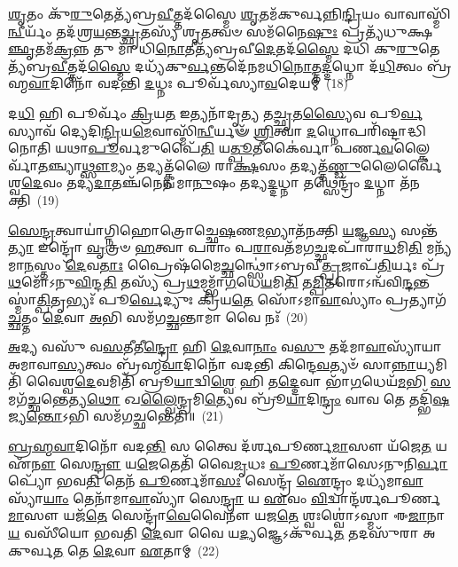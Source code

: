 \-\ul{𑌶𑍃}\-𑌤𑌂 𑌕𑍁᳴\-\ul{𑌰𑍁}\-𑌤𑍇𑌤𑍍𑌯᳴𑌬𑍍𑌰\-\ul{𑌵𑍀}\-𑌤𑍍𑌤𑌦᳴𑌸𑍍𑌮𑍈 \ul{𑌶𑍃}\-𑌤𑌮᳴𑌕𑍁𑌰𑍍𑌵𑌨𑍍𑌨𑌿\-\ul{𑌨𑍍𑌦𑍍𑌰𑌿}\-𑌯𑌂 𑌵𑌾𑌵𑌾𑌸𑍍𑌮𑌿᳴\-\ul{𑌨𑍍𑌵𑍀}\-𑌰𑍍𑌯𑌂᳴ 𑌤𑌦᳴𑌶𑍍𑌰\-\ul{𑌯}\-𑌨𑍍𑌤\-\ul{𑌚𑍍𑌛𑍃}\-𑌤𑌸𑍍𑌯᳴ 𑌶𑍃\-\ul{𑌤}\-𑌤𑍍𑌵𑍞 𑌸𑌮᳴𑌨𑍈\-\ul{𑌷𑍁𑌃} 𑌪𑍍𑌰𑌤𑍍𑌯᳴𑌧𑍁𑌕𑍍𑌷\-\ul{𑌞𑍍𑌛𑍃}\-𑌤𑌮᳴\-\ul{𑌕𑍍𑌰}\-𑌨𑍍𑌨 𑌤𑍁 𑌮𑌾᳴ 𑌧𑌿\-\ul{𑌨𑍋}\-𑌤𑍀𑌤𑍍𑌯᳴𑌬𑍍𑌰𑌵𑍀\-\ul{𑌦𑍇}\-𑌤𑌦᳴\-\ul{𑌸𑍍𑌮𑍈} 𑌦𑌧𑌿᳴ 𑌕𑍁\-\ul{𑌰𑍁}\-𑌤𑍇𑌤𑍍𑌯᳴𑌬𑍍𑌰\-\ul{𑌵𑍀}\-𑌤𑍍𑌤𑌦᳴\-\ul{𑌸𑍍𑌮𑍈} 𑌦𑌧𑍍𑌯᳴𑌕𑍁\-\ul{𑌰𑍍𑌵}\-𑌨𑍍𑌤𑌦𑍇᳴𑌨𑌮𑌧𑌿\-\ul{𑌨𑍋}\-𑌤𑍍𑌤\-\ul{𑌦𑍍𑌦}\-𑌧𑍍𑌨𑍋 𑌦᳴\-\ul{𑌧𑌿}\-𑌤𑍍𑌵𑌂 𑌬𑍍𑌰᳴𑌹𑍍𑌮\-\ul{𑌵𑌾}\-𑌦𑌿𑌨𑍋᳴ 𑌵𑌦𑌨𑍍𑌤𑌿 \ul{𑌦}\-𑌧𑍍𑌨𑌃 𑌪𑍂𑌰𑍍𑌵᳴𑌸𑍍𑌯𑌾\-\ul{𑌵}\-𑌦𑍇𑌯𑌮𑍍॑~(18)

𑌦\-\ul{𑌧𑌿} 𑌹𑌿 𑌪𑍂𑌰𑍍𑌵𑌂᳴ \ul{𑌕𑍍𑌰𑌿}\-𑌯\-\ul{𑌤} 𑌇𑌤𑍍𑌯𑌨𑌾᳴𑌦𑍃\-\ul{𑌤𑍍𑌯} 𑌤\-\ul{𑌚𑍍𑌛𑍃}\-𑌤\-\ul{𑌸𑍍𑌯𑍈}\-𑌵 𑌪𑍂\-\ul{𑌰𑍍𑌵}\-𑌸𑍍𑌯𑌾𑌵᳴ 𑌦𑍍𑌯𑍇𑌦𑌿\-\ul{𑌨𑍍𑌦𑍍𑌰𑌿}\-𑌯\-\ul{𑌮𑍇}\-𑌵𑌾𑌸𑍍𑌮𑌿᳴\-\ul{𑌨𑍍𑌵𑍀}\-𑌰𑍍𑌯𑍟᳴ \ul{𑌶𑍍𑌰𑌿}\-𑌤𑍍𑌵𑌾 \ul{𑌦}\-𑌧𑍍𑌨𑍋𑌪𑌰𑌿᳴𑌷𑍍𑌟𑌾𑌦𑍍𑌧𑌿𑌨𑍋𑌤𑌿 𑌯𑌥𑌾\-\ul{𑌪𑍂}\-𑌰𑍍𑌵𑌮𑍁𑌪𑍈᳴\-\ul{𑌤𑌿} 𑌯\-\ul{𑌤𑍍𑌪𑍂}\-𑌤𑍀𑌕𑍈॑𑌰𑍍𑌵𑌾 𑌪𑌰𑍍𑌣\-\ul{𑌵}\-𑌲𑍍𑌕𑍈𑌰𑍍𑌵𑌾᳴\-\ul{𑌤}\-𑌞𑍍𑌚𑍍𑌯𑌾\-\ul{𑌥𑍍𑌸𑍗}\-𑌮𑍍𑌯𑌂 𑌤𑌦𑍍𑌯𑌤𑍍𑌕𑍍𑌵᳴𑌲𑍈 𑌰𑌾\-\ul{𑌕𑍍𑌷}\-𑌸𑌂 𑌤𑌦𑍍𑌯𑌤𑍍𑌤᳴\-\ul{𑌣𑍍𑌡𑍁}\-𑌲𑍈𑌰𑍍𑌵𑍈॑𑌶𑍍𑌵\-\ul{𑌦𑍇}\-𑌵𑌂 𑌤𑌦𑍍𑌯\-\ul{𑌦𑌾}\-𑌤𑌞𑍍𑌚᳴𑌨𑍇𑌨 𑌮𑌾\-\ul{𑌨𑍁}\-𑌷𑌂 𑌤𑌦𑍍𑌯\-\ul{𑌦𑍍𑌦}\-𑌧𑍍𑌨𑌾 𑌤𑌥𑍍𑌸𑍇𑌨𑍍𑌦𑍍𑌰𑌂᳴ \ul{𑌦}\-𑌧𑍍𑌨𑌾 𑌤᳴𑌨𑌕𑍍𑌤𑌿~(19)

\-\ul{𑌸𑍇}\-\-\ul{𑌨𑍍𑌦𑍍𑌰}\-𑌤𑍍𑌵𑌾𑌯𑌾॑𑌗𑍍𑌨𑌿𑌹𑍋𑌤𑍍𑌰𑍋𑌚𑍍𑌛𑍇\-\ul{𑌷}\-𑌣\-\ul{𑌮}\-𑌭𑍍𑌯𑌾𑌤᳴𑌨𑌕𑍍𑌤𑌿 \ul{𑌯}\-𑌜𑍍𑌞\-\ul{𑌸𑍍𑌯} 𑌸𑌨𑍍𑌤᳴\-\ul{𑌤𑍍𑌯𑌾} 𑌇𑌨𑍍𑌦𑍍𑌰𑍋᳴ \ul{𑌵𑍃}\-𑌤𑍍𑌰𑍞 \ul{𑌹}\-𑌤𑍍𑌵𑌾 𑌪𑌰𑌾𑌂॑ 𑌪\-\ul{𑌰𑌾}\-𑌵𑌤᳴𑌮𑌗\-\ul{𑌚𑍍𑌛}\-𑌦𑌪𑌾᳴𑌰𑌾\-\ul{𑌧}\-𑌮𑌿\-\ul{𑌤𑌿} 𑌮𑌨𑍍𑌯᳴𑌮𑌾\-\ul{𑌨}\-𑌸𑍍𑌤𑌂 \ul{𑌦𑍇}\-𑌵\-\ul{𑌤𑌾𑌃} 𑌪𑍍𑌰𑍈𑌷᳴𑌮𑍈\-\ul{𑌚𑍍𑌛}\-𑌨𑍍𑌥𑍍𑌸𑍋॑\-𑌽𑌬𑍍𑌰𑌵𑍀\-\ul{𑌤𑍍𑌪𑍍𑌰}\-𑌜𑌾𑌪᳴\-\ul{𑌤𑌿}\-𑌰𑍍𑌯𑌃 𑌪𑍍𑌰᳴\-\ul{𑌥}\-𑌮𑍋᳴\-𑌽𑌨𑍁\-\ul{𑌵𑌿}\-𑌨𑍍𑌦\-\ul{𑌤𑌿} 𑌤𑌸𑍍𑌯᳴ 𑌪𑍍𑌰\-\ul{𑌥}\-𑌮𑌮𑍍𑌭𑌾᳴\-\ul{𑌗}\-𑌧𑍇\-\ul{𑌯}\-𑌮𑌿\-\ul{𑌤𑌿} 𑌤\-\ul{𑌮𑍍𑌪𑌿}\-𑌤𑌰𑍋\-𑌽𑌨𑍍𑌵᳴𑌵𑌿\-\ul{𑌨𑍍𑌦}\-𑌨𑍍𑌤𑌸𑍍𑌮𑌾॑\-\ul{𑌤𑍍𑌪𑌿}\-𑌤𑍃𑌭𑍍𑌯𑌃᳴ 𑌪𑍂\-\ul{𑌰𑍍𑌵𑍇}\-𑌦𑍍𑌯𑍁𑌃 𑌕𑍍𑌰𑌿᳴𑌯\-\ul{𑌤𑍇} 𑌸𑍋᳴\-𑌽𑌮𑌾\-\ul{𑌵𑌾}\-𑌸𑍍𑌯𑌾𑌂॑ 𑌪𑍍𑌰𑌤𑍍𑌯𑌾𑌗᳴\-\ul{𑌚𑍍𑌛}\-𑌤𑍍𑌤𑌂 \ul{𑌦𑍇}\-𑌵𑌾 \ul{𑌅}\-𑌭𑌿 𑌸𑌮᳴𑌗\-\ul{𑌚𑍍𑌛}\-𑌨𑍍𑌤𑌾𑌮𑌾 𑌵𑍈 𑌨𑌃᳴~(20)

\-\ul{𑌅}\-𑌦𑍍𑌯 𑌵𑌸𑍁᳴ 𑌵\-\ul{𑌸}\-𑌤𑍀𑌤𑍀\-\ul{𑌨𑍍𑌦𑍍𑌰𑍋} 𑌹𑌿 \ul{𑌦𑍇}\-𑌵𑌾\-\ul{𑌨𑌾𑌂} 𑌵\-\ul{𑌸𑍁} 𑌤𑌦᳴𑌮𑌾\-\ul{𑌵𑌾}\-𑌸𑍍𑌯𑌾᳴𑌯𑌾 𑌅𑌮𑌾𑌵𑌾\-\ul{𑌸𑍍𑌯}\-𑌤𑍍𑌵𑌂 𑌬𑍍𑌰᳴𑌹𑍍𑌮\-\ul{𑌵𑌾}\-𑌦𑌿𑌨𑍋᳴ 𑌵𑌦𑌨𑍍𑌤𑌿 𑌕𑌿𑌨𑍍𑌦𑍇\-\ul{𑌵}\-𑌤𑍍𑌯𑍞᳴ 𑌸𑌾\-\ul{𑌨𑍍𑌨𑌾}\-𑌯𑍍𑌯𑌮𑌿𑌤𑌿᳴ 𑌵𑍈𑌶𑍍𑌵\-\ul{𑌦𑍇}\-𑌵𑌮𑌿𑌤𑌿᳴ 𑌬𑍍𑌰𑍂\-\ul{𑌯𑌾}\-𑌦𑍍𑌵𑌿\-\ul{𑌶𑍍𑌵𑍇} 𑌹𑌿 𑌤\-\ul{𑌦𑍍𑌦𑍇}\-𑌵𑌾 𑌭𑌾᳴\-\ul{𑌗}\-𑌧𑍇𑌯᳴\-\ul{𑌮}\-𑌭𑌿 \ul{𑌸}\-𑌮𑌗᳴\-\ul{𑌚𑍍𑌛}\-𑌨𑍍𑌤𑍇𑌤𑍍𑌯\-\ul{𑌥𑍋} 𑌖\-\ul{𑌲𑍍𑌵𑍈}\-𑌨𑍍𑌦𑍍𑌰𑌮𑌿\-\ul{𑌤𑍍𑌯𑍇}\-𑌵 𑌬𑍍𑌰𑍂᳴\-\ul{𑌯𑌾}\-𑌦𑌿\-\ul{𑌨𑍍𑌦𑍍𑌰𑌂} 𑌵𑌾𑌵 𑌤𑍇 𑌤𑌦𑍍𑌭𑌿᳴\-\ul{𑌷}\-𑌜𑍍𑌯\-\ul{𑌨𑍍𑌤𑍋}\-\-𑌽𑌭𑌿 𑌸𑌮᳴𑌗\-\ul{𑌚𑍍𑌛}\-𑌨𑍍𑌤𑍇𑌤𑌿᳴॥~(21)

{}%

\-\ul{𑌬𑍍𑌰}\-\-\ul{𑌹𑍍𑌮}\-\-\ul{𑌵𑌾}\-𑌦𑌿𑌨𑍋᳴ 𑌵𑌦\-\ul{𑌨𑍍𑌤𑌿} 𑌸 𑌤𑍍𑌵𑍈 𑌦᳴𑌰𑍍𑌶𑌪𑍂𑌰𑍍𑌣\-\ul{𑌮𑌾}\-𑌸𑍗 𑌯᳴𑌜𑍇\-\ul{𑌤} 𑌯 𑌏᳴\-\ul{𑌨𑍗} 𑌸𑍇\-\ul{𑌨𑍍𑌦𑍍𑌰𑍗} 𑌯\-\ul{𑌜𑍇}\-𑌤𑍇𑌤𑌿᳴ 𑌵𑍈\-\ul{𑌮𑍃}\-𑌧𑌃 \ul{𑌪𑍂}\-𑌰𑍍𑌣𑌮𑌾᳴𑌸𑍇\-𑌽𑌨𑍁𑌨𑌿\-\ul{𑌰𑍍𑌵𑌾}\-𑌪𑍍𑌯𑍋᳴ 𑌭𑌵\-\ul{𑌤𑌿} 𑌤𑍇𑌨᳴ \ul{𑌪𑍂}\-𑌰𑍍𑌣𑌮𑌾᳴\-\ul{𑌸𑌃} 𑌸𑍇𑌨𑍍𑌦𑍍𑌰᳴ \ul{𑌐}\-𑌨𑍍𑌦𑍍𑌰𑌂 𑌦𑌧𑍍𑌯᳴𑌮𑌾\-\ul{𑌵𑌾}\-𑌸𑍍𑌯𑌾᳴\-\ul{𑌯𑌾𑌂} 𑌤𑍇𑌨𑌾᳴𑌮𑌾\-\ul{𑌵𑌾}\-𑌸𑍍𑌯𑌾᳴ 𑌸𑍇\-\ul{𑌨𑍍𑌦𑍍𑌰𑌾} 𑌯 \ul{𑌏}\-𑌵𑌂 \ul{𑌵𑌿}\-𑌦𑍍𑌵𑌾𑌨𑍍𑌦᳴𑌰𑍍𑌶𑌪𑍂𑌰𑍍𑌣\-\ul{𑌮𑌾}\-𑌸𑍗 𑌯𑌜᳴\-\ul{𑌤𑍇} 𑌸𑍇𑌨𑍍𑌦𑍍𑌰𑌾᳴\-\ul{𑌵𑍇}\-𑌵𑍈𑌨𑍗᳴ 𑌯𑌜\-\ul{𑌤𑍇} 𑌶𑍍𑌵𑌃𑌶𑍍𑌵𑍋॑\-𑌽𑌸𑍍𑌮𑌾 𑌈\-\ul{𑌜𑌾}\-𑌨𑌾\-\ul{𑌯} 𑌵𑌸𑍀᳴𑌯𑍋 𑌭𑌵𑌤𑌿 \ul{𑌦𑍇}\-𑌵𑌾 𑌵𑍈 𑌯\-\ul{𑌦𑍍𑌯}\-𑌜𑍍𑌞𑍇\-𑌽𑌕𑍁᳴𑌰𑍍𑌵\-\ul{𑌤} 𑌤𑌦𑌸𑍁᳴𑌰𑌾 𑌅𑌕𑍁𑌰𑍍𑌵\-\ul{𑌤} 𑌤𑍇 \ul{𑌦𑍇}\-𑌵𑌾 \ul{𑌏}\-𑌤𑌾𑌮𑍍~(22)

